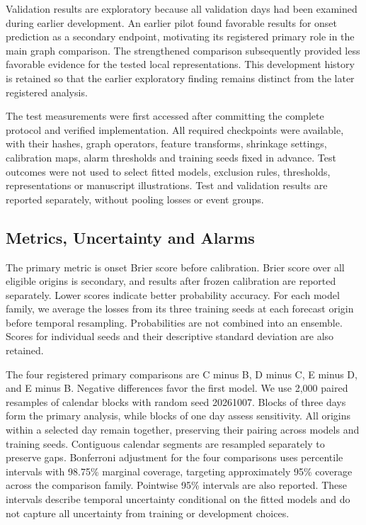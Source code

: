 \documentclass{llncs}
\begin{document}
Validation results are exploratory because all validation days had been examined during earlier development. An earlier pilot found favorable results for onset prediction as a secondary endpoint, motivating its registered primary role in the main graph comparison. The strengthened comparison subsequently provided less favorable evidence for the tested local representations. This development history is retained so that the earlier exploratory finding remains distinct from the later registered analysis.

The test measurements were first accessed after committing the complete protocol and verified implementation. All required checkpoints were available, with their hashes, graph operators, feature transforms, shrinkage settings, calibration maps, alarm thresholds and training seeds fixed in advance. Test outcomes were not used to select fitted models, exclusion rules, thresholds, representations or manuscript illustrations. Test and validation results are reported separately, without pooling losses or event groups.






\subsection{Metrics, Uncertainty and Alarms}
The primary metric is onset Brier score before calibration. Brier score over all eligible origins is secondary, and results after frozen calibration are reported separately. Lower scores indicate better probability accuracy. For each model family, we average the losses from its three training seeds at each forecast origin before temporal resampling. Probabilities are not combined into an ensemble. Scores for individual seeds and their descriptive standard deviation are also retained.

The four registered primary comparisons are C minus B, D minus C, E minus D, and E minus B. Negative differences favor the first model. We use 2,000 paired resamples of calendar blocks with random seed 20261007. Blocks of three days form the primary analysis, while blocks of one day assess sensitivity. All origins within a selected day remain together, preserving their pairing across models and training seeds. Contiguous calendar segments are resampled separately to preserve gaps. Bonferroni adjustment for the four comparisons uses percentile intervals with 98.75\% marginal coverage, targeting approximately 95\% coverage across the comparison family. Pointwise 95\% intervals are also reported. These intervals describe temporal uncertainty conditional on the fitted models and do not capture all uncertainty from training or development choices.
\end{document}
